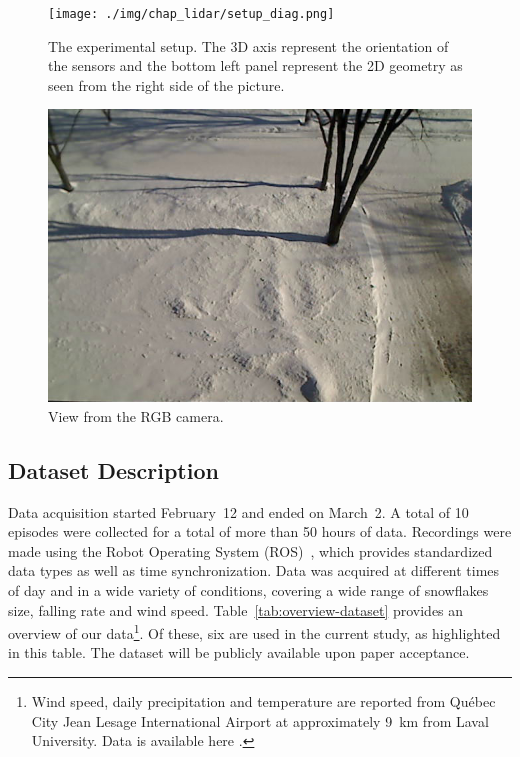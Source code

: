 \begin{figure}[h]
    \centering
    \texttt{[image: ./img/chap\_lidar/setup\_diag.png]}
    \caption[The experimental setup.]{The experimental setup. The 3D axis represent the orientation of the sensors and the bottom left panel represent the 2D geometry as seen from the right side of the picture.}
    \label{fig:setup}
\end{figure}

\begin{figure}[h]
    \centering
    \includegraphics[width=0.90\linewidth]{./img/chap_lidar/camera_view.jpg}
    \caption[View from the camera.]{View from the RGB camera.}
    \label{fig:view}
\end{figure}

\subsection{Dataset Description}
Data acquisition started February~12 and ended on March~2. A total of 10 episodes were collected for a total of more than 50 hours of data. Recordings were made using the Robot Operating System (ROS)~\citep{ROSWeb}, which provides standardized data types as well as time synchronization. Data was acquired at different times of day and in a wide variety of conditions, covering a wide range of snowflakes size, falling rate and wind speed.  Table~\ref{tab:overview-dataset} provides an overview of our data\footnote{Wind speed, daily precipitation and temperature are reported from Québec City Jean Lesage International Airport at approximately \SI{9}{\km} from Laval University. Data is available here \citep{WeatherCanada}.}. Of these, six are used in the current study, as highlighted in this table. The dataset will be publicly available upon paper acceptance. %

